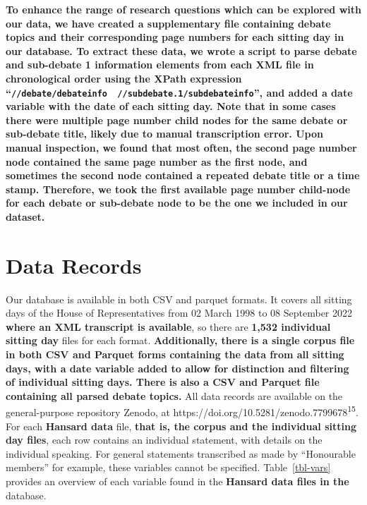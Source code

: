 \documentclass[
  letterpaper,
  DIV=11,
  numbers=noendperiod]{scrartcl}
\begin{document}
\textbf{To enhance the range of research questions which can be explored
with our data, we have created a supplementary file containing debate
topics and their corresponding page numbers for each sitting day in our
database. To extract these data, we wrote a script to parse debate and
sub-debate 1 information elements from each XML file in chronological
order using the XPath expression
``\texttt{//debate/debateinfo\ \textbar{}\ //subdebate.1/subdebateinfo}'',
and added a date variable with the date of each sitting day. Note that
in some cases there were multiple page number child nodes for the same
debate or sub-debate title, likely due to manual transcription error.
Upon manual inspection, we found that most often, the second page number
node contained the same page number as the first node, and sometimes the
second node contained a repeated debate title or a time stamp.
Therefore, we took the first available page number child-node for each
debate or sub-debate node to be the one we included in our dataset.}

\hypertarget{data-records}{%
\section{Data Records}\label{data-records}}

Our database is available in both CSV and parquet formats. It covers all
sitting days of the House of Representatives from 02 March 1998 to 08
September 2022 \textbf{where an XML transcript is available}, so there
are \textbf{1,532 individual sitting day} files for each format.
\textbf{Additionally, there is a single corpus file in both CSV and
Parquet forms containing the data from all sitting days, with a date
variable added to allow for distinction and filtering of individual
sitting days. There is also a CSV and Parquet file containing all parsed
debate topics.} All data records are available on the general-purpose
repository Zenodo, at
https://doi.org/10.5281/zenodo.7799678\textsuperscript{15}. For each
\textbf{Hansard data} file, \textbf{that is, the corpus and the
individual sitting day files}, each row contains an individual
statement, with details on the individual speaking. For general
statements transcribed as made by ``Honourable members'' for example,
these variables cannot be specified. Table~\ref{tbl-vars} provides an
overview of each variable found in the \textbf{Hansard data files in
the} database.
\end{document}

